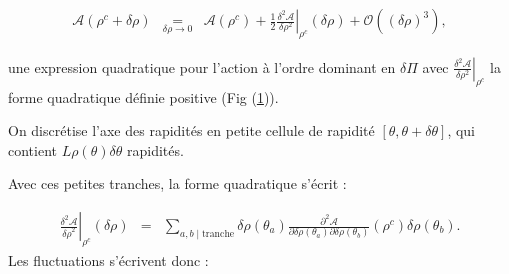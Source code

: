 \begin{eqnarray*}  
	\mathcal{A}(\rho^c + \delta \rho) & \underset{ \delta \rho \to 0 }{=} & \mathcal{A}(\rho^c)  + \frac{1}{2} \left. \frac{\delta^2 \mathcal{A}}{\delta \rho^2} \right|_{\rho^c} (\delta \rho) + \mathcal{O}((\delta \rho)^3),  
\end{eqnarray*}  

une expression quadratique pour l'action à l'ordre dominant en \( \delta \Pi \) avec $\left. \frac{\delta^2 \mathcal{A}}{\delta \rho^2} \right|_{\rho^c}$ la forme quadratique définie positive (Fig (\ref{fig.fluctu.A})).

\begin{figure}[H]
	\centering 
	\captionsetup{skip=10pt} %
	\label{fig.fluctu.A}
\end{figure}


On discrétise l'axe des rapidités en  petite cellule de rapidité $[\theta, \theta+\delta\theta]$, qui contient $L\rho(\theta) \delta \theta$ rapidités. 
	



Avec ces petites tranches, la forme quadratique s’écrit :

\begin{eqnarray*}
    \left. \frac{\delta^2 \mathcal{A}}{{\delta \rho}^2} \right|_{\rho^c}(\delta \rho ) &=&  \sum_{a,b \mid \text{tranche}}  
    \delta \rho(\theta_a)  \frac{\partial^2 \mathcal{A}}{\partial \delta \rho(\theta_a) \partial \delta \rho(\theta_b) } (\rho^c)  \delta \rho(\theta_b).
\end{eqnarray*}
Les fluctuations s’écrivent donc :

